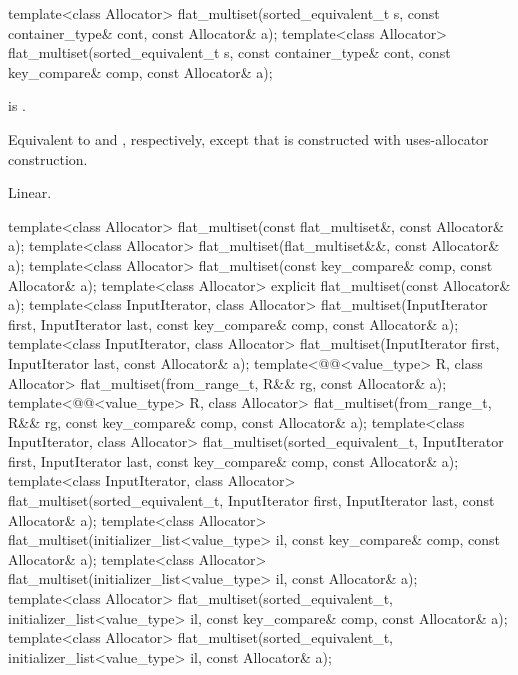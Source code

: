 %
\begin{itemdecl}
template<class Allocator>
  flat_multiset(sorted_equivalent_t s, const container_type& cont, const Allocator& a);
template<class Allocator>
  flat_multiset(sorted_equivalent_t s, const container_type& cont,
                const key_compare& comp, const Allocator& a);
\end{itemdecl}

\begin{itemdescr}
\pnum
\constraints
{} is .

\pnum
\effects
Equivalent to  and
, respectively,
except that  is constructed with
uses-allocator construction.

\pnum
\complexity
Linear.
\end{itemdescr}

%
\begin{itemdecl}
template<class Allocator>
  flat_multiset(const flat_multiset&, const Allocator& a);
template<class Allocator>
  flat_multiset(flat_multiset&&, const Allocator& a);
template<class Allocator>
  flat_multiset(const key_compare& comp, const Allocator& a);
template<class Allocator>
  explicit flat_multiset(const Allocator& a);
template<class InputIterator, class Allocator>
  flat_multiset(InputIterator first, InputIterator last,
                const key_compare& comp, const Allocator& a);
template<class InputIterator, class Allocator>
  flat_multiset(InputIterator first, InputIterator last, const Allocator& a);
template<@@<value_type> R, class Allocator>
  flat_multiset(from_range_t, R&& rg, const Allocator& a);
template<@@<value_type> R, class Allocator>
  flat_multiset(from_range_t, R&& rg, const key_compare& comp, const Allocator& a);
template<class InputIterator, class Allocator>
  flat_multiset(sorted_equivalent_t, InputIterator first, InputIterator last,
                const key_compare& comp, const Allocator& a);
template<class InputIterator, class Allocator>
  flat_multiset(sorted_equivalent_t, InputIterator first, InputIterator last, const Allocator& a);
template<class Allocator>
  flat_multiset(initializer_list<value_type> il, const key_compare& comp, const Allocator& a);
template<class Allocator>
  flat_multiset(initializer_list<value_type> il, const Allocator& a);
template<class Allocator>
  flat_multiset(sorted_equivalent_t, initializer_list<value_type> il,
                const key_compare& comp, const Allocator& a);
template<class Allocator>
  flat_multiset(sorted_equivalent_t, initializer_list<value_type> il, const Allocator& a);
\end{itemdecl}


